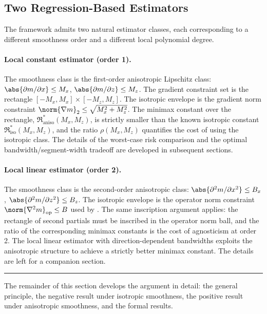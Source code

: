 \subsection{Two Regression-Based Estimators}\label{sec:overview:estimators}

The framework admits two natural estimator classes, each corresponding to a different smoothness order and a different local polynomial degree.

\paragraph{Local constant estimator (order 1).}
The smoothness class is the first-order anisotropic Lipschitz class: $\abs{\partial m / \partial x} \leq M_x$, $\abs{\partial m / \partial z} \leq M_z$.
The gradient constraint set is the rectangle $[-M_x, M_x] \times [-M_z, M_z]$.
The isotropic envelope is the gradient norm constraint $\norm{\nabla m}_2 \leq \sqrt{M_x^2 + M_z^2}$.
The minimax constant over the rectangle, $\mathfrak{R}^*_{\mathrm{aniso}}(M_x, M_z)$, is strictly smaller than the known isotropic constant $\mathfrak{R}^*_{\mathrm{iso}}(M_x, M_z)$, and the ratio $\rho(M_x, M_z)$ quantifies the cost of using the isotropic class.
The details of the worst-case risk comparison and the optimal bandwidth/segment-width tradeoff are developed in subsequent sections.

\paragraph{Local linear estimator (order 2).}
The smoothness class is the second-order anisotropic class: $\abs{\partial^2 m / \partial x^2} \leq B_x$, $\abs{\partial^2 m / \partial z^2} \leq B_z$.
The isotropic envelope is the operator norm constraint $\norm{\nabla^2 m}_{\mathrm{op}} \leq B$ used by \textcite{imbens_optimized_2019}.
The same inscription argument applies: the rectangle of second partials must be inscribed in the operator norm ball, and the ratio of the corresponding minimax constants is the cost of agnosticism at order 2.
The local linear estimator with direction-dependent bandwidths exploits the anisotropic structure to achieve a strictly better minimax constant.
The details are left for a companion section.

\bigskip
\noindent\rule{\textwidth}{0.4pt}
\bigskip


The remainder of this section develops the argument in detail: the general principle, the negative result under isotropic smoothness, the positive result under anisotropic smoothness, and the formal results.

